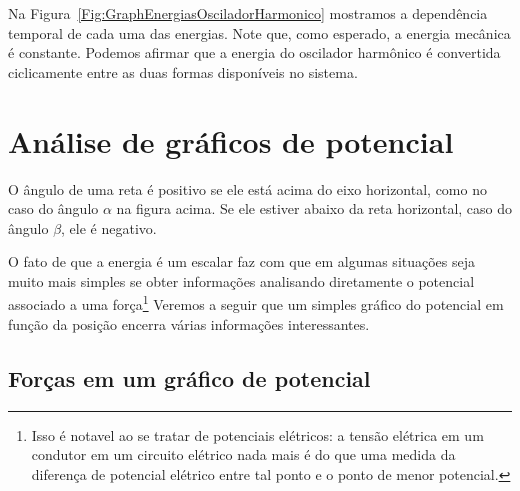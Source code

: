 Na Figura~\ref{Fig:GraphEnergiasOsciladorHarmonico} mostramos a dependência temporal de cada uma das energias. Note que, como esperado, a energia mecânica é constante. Podemos afirmar que a energia do oscilador harmônico é convertida ciclicamente entre as duas formas disponíveis no sistema.

\section{Análise de gráficos de potencial}

\begin{marginfigure}[-3cm]
\caption{O ângulo de uma reta é positivo se ele está acima do eixo horizontal, como no caso do ângulo $\alpha$ na figura acima. Se ele estiver abaixo da reta horizontal, caso do ângulo $\beta$, ele é negativo. \label{Fig:SinalInclinacao}}
\end{marginfigure}

O fato de que a energia é um escalar faz com que em algumas situações seja muito mais simples se obter informações analisando diretamente o potencial associado a uma força\footnote{Isso é notavel ao se tratar de potenciais elétricos: a tensão elétrica em um condutor em um circuito elétrico nada mais é do que uma medida da diferença de potencial elétrico entre tal ponto e o ponto de menor potencial.} Veremos a seguir que um simples gráfico do potencial em função da posição encerra várias informações interessantes.

\subsection{Forças em um gráfico de potencial}


